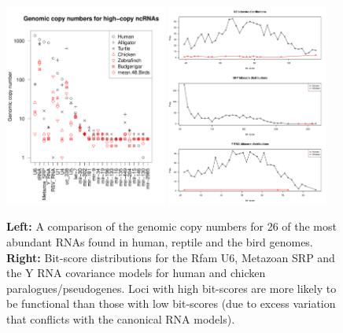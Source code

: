 \documentclass[10pt]{bmc_article}
\newenvironment{bmcformat}{\begin{raggedright}\baselineskip20pt\sloppy\setboolean{publ}{false}}{\end{raggedright}\baselineskip20pt\sloppy}
\begin{document}
\begin{bmcformat}
\begin{figure}[ht]
\includegraphics[width=0.475\textwidth]{figures/high-copy-numbers.pdf}
\includegraphics[width=0.475\textwidth]{figures/high-copy-numbers-U6-SRP.pdf}
  \caption[]{{\bf Left:} A comparison of the genomic copy numbers for
    26 of the most abundant RNAs found in human, reptile and the bird
    genomes. {\bf Right:} Bit-score distributions for the Rfam U6,
    Metazoan SRP and the Y RNA covariance models for human and chicken
    paralogues/pseudogenes. Loci with high bit-scores are more likely
    to be functional than those with low bit-scores (due to excess
    variation that conflicts with the canonical RNA
    models).}\label{fig:14}
\end{figure}

\clearpage
\newpage


\end{bmcformat}
\end{document}
